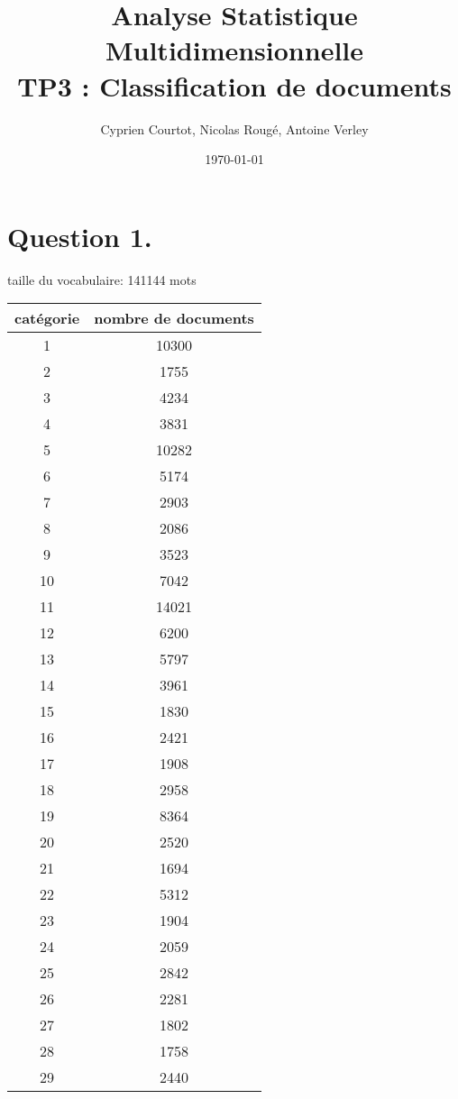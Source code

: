 \documentclass[a4paper]{article}
\title{Analyse Statistique Multidimensionnelle \\ TP3 : Classification de documents}
\author{Cyprien Courtot, Nicolas Rougé, Antoine Verley}
\date{\today}
\begin{document}
\maketitle

\section{Question 1.}
taille du vocabulaire: 141144 mots\\

\begin{tabular}{|c|c|}
\hline
catégorie & nombre de documents \\ \hline
1 & 10300 \\ \hline
2 & 1755 \\ \hline
3 & 4234 \\ \hline
4 & 3831 \\ \hline
5 & 10282 \\ \hline
6 & 5174 \\ \hline
7 & 2903 \\ \hline
8 & 2086 \\ \hline
9 & 3523 \\ \hline
10 & 7042 \\ \hline
11 & 14021 \\ \hline
12 & 6200 \\ \hline
13 & 5797 \\ \hline
14 & 3961 \\ \hline
15 & 1830 \\ \hline
16 & 2421 \\ \hline
17 & 1908 \\ \hline
18 & 2958 \\ \hline
19 & 8364 \\ \hline
20 & 2520 \\ \hline
21 & 1694 \\ \hline
22 & 5312 \\ \hline
23 & 1904 \\ \hline
24 & 2059 \\ \hline
25 & 2842 \\ \hline
26 & 2281 \\ \hline
27 & 1802 \\ \hline
28 & 1758 \\ \hline
29 & 2440 \\ \hline
\end{tabular}
\end{document}
